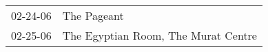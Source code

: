\begin{supertabular}{p{0.25\columnwidth}p{0.75\columnwidth}}
 02-24-06 &                          The Pageant \\
 02-25-06 &  The Egyptian Room, The Murat Centre \\
\end{supertabular}
